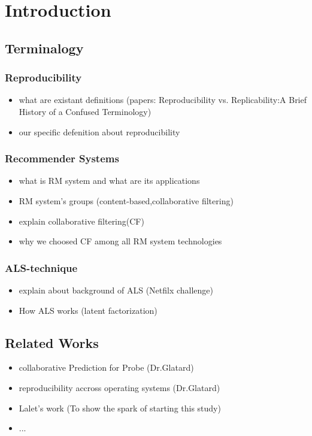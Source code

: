 \chapter{Introduction}
\section{Terminalogy}
\subsection{Reproducibility}
\begin{tcolorbox}
	\begin{itemize}
		\item what are existant definitions 
		(papers: Reproducibility vs. Replicability:A Brief History of a Confused Terminology)\cite{10.3389/fninf.2017.00076}
		\item our specific defenition about reproducibility
\end{itemize}
\end{tcolorbox}
\subsection{Recommender Systems}
\begin{tcolorbox}
	\begin{itemize}
		\item what is RM system and what are its applications
		\item RM system's groups (content-based,collaborative filtering)
		\item explain collaborative filtering(CF)
		\item why we choosed CF among all RM system technologies  
\end{itemize}
\end{tcolorbox}

\subsection{ALS-technique}
\begin{tcolorbox}
	\begin{itemize}
		\item explain about background of ALS (Netfilx challenge)
		\item How ALS works (latent factorization)
\end{itemize}
\end{tcolorbox}

\section{Related Works}
\begin{tcolorbox}
	\begin{itemize}
		\item collaborative Prediction for Probe (Dr.Glatard)
		\item reproducibility accross operating systems (Dr.Glatard)
		\item Lalet's work (To show the spark of starting this study)
		\item ...
\end{itemize}
\end{tcolorbox}

